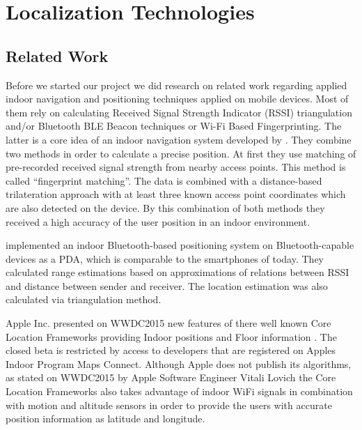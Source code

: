 \chapter{Localization Technologies}
\label{cha:relatedwork}

\section{Related Work}

Before we started our project we did research on related work regarding applied indoor navigation and positioning techniques applied on mobile devices. Most of them rely on calculating Received Signal Strength Indicator (RSSI) triangulation and/or Bluetooth BLE Beacon techniques or Wi-Fi Based Fingerprinting. The latter is a core idea of an indoor navigation system developed by \cite{ChaSo2012}. They combine two methods in order to calculate a precise position. At first they use matching of pre-recorded received signal strength from nearby access points. This method is called \enquote{fingerprint matching}. The data is combined with a distance-based trilateration approach with at least three known access point coordinates which are also detected on the device. By this combination of both methods they received a high accuracy of the user position in an indoor environment.

\cite{FelKyaZap2012} implemented an indoor Bluetooth-based positioning system on Bluetooth-capable devices as a PDA, which is comparable to the smartphones of today. They calculated range estimations based on approximations of relations between RSSI and distance between sender and receiver. The location estimation was also calculated via triangulation method.

Apple Inc. presented on WWDC2015 new features of there well known Core Location Frameworks providing Indoor positions and Floor information \cite{wwdc15}. The closed beta is restricted by access to developers that are registered on Apples Indoor Program Maps Connect. Although Apple does not publish its algorithms, as stated on WWDC2015 by Apple Software Engineer Vitali Lovich the Core Location Frameworks also takes advantage of indoor WiFi signals in combination with motion and altitude sensors in order to provide the users with accurate position information as latitude and longitude.

